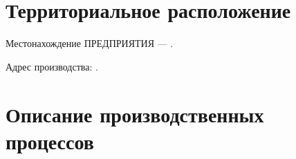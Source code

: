 






\section{Территориальное расположение}
%

Местонахождение ПРЕДПРИЯТИЯ --- \CURADDRESS.

Адрес производства:
\ADDRESS.



\section{Описание производственных процессов}































